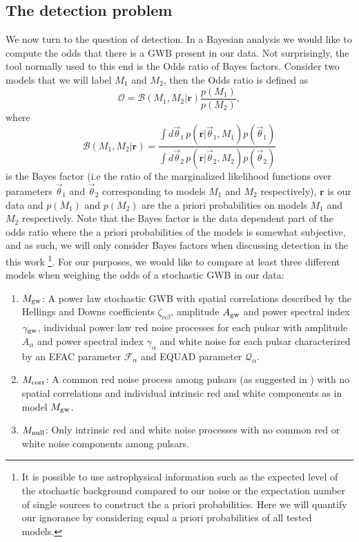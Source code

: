 \documentclass[iop]{emulateapj} \usepackage{apjfonts}
\newcommand{\be}{\begin{equation}} \newcommand{\ee}{\end{equation}}
\begin{document}
 
\subsection{The detection problem} 

We now turn to the question of
detection. In a Bayesian analysis we would like to compute the odds
that there is a GWB present in our data. Not surprisingly, the tool
normally used to this end is the Odds ratio of Bayes factors. Consider
two models that we will label $M_{1}$ and $M_{2}$, then the Odds ratio
is defined as \be
\mathcal{O}=\mathcal{B}(M_{1},M_{2}|\mathbf{r})\frac{p(M_{1})}{p(M_{2})},
\ee
 where
 \be
 \mathcal{B}(M_{1},M_{2}|\mathbf{r})=\frac{\int
d\vec\theta_{1}\,p(\mathbf{r}|\vec\theta_{1},M_{1})p(\vec\theta_{1})}{\int
d\vec\theta_{2}\,p(\mathbf{r}|\vec\theta_{2},M_{2})p(\vec\theta_{2})}
 \ee
 is the Bayes factor (i.e the ratio of the marginalized likelihood
functions over parameters $\vec\theta_{1}$ and $\vec\theta_{2}$
corresponding to models $M_{1}$ and $M_{2}$ respectively),
$\mathbf{r}$ is our data and $p(M_{1})$ and $p(M_{2})$ are the a
priori probabilities on models $M_{1}$ and $M_{2}$ respectively. Note
that the Bayes factor is the data dependent part of the odds ratio
where the a priori probabilities of the models is somewhat subjective,
and as such, we will only consider Bayes factors when discussing
detection in the this work \footnote{It is possible to use
astrophysical information such as the expected level of the stochastic
background compared to our noise or the expectation number of single
sources to construct the a priori probabilities. Here we will quantify
our ignorance by considering equal a priori probabilities of all
tested models.}. For our purposes, we would like to compare at least
three different models when weighing the odds of a stochastic GWB in
our data:
 \begin{enumerate}
 
 \item $M_{\rm gw}$: A power law stochastic GWB with spatial
correlations described by the Hellings and Downs coefficients
$\zeta_{\alpha\beta}$, amplitude $A_{\rm gw}$ and power spectral index
$\gamma_{\rm gw}$, individual power law red noise processes for each
pulsar with amplitude $A_{\alpha}$ and power spectral index
$\gamma_{\alpha}$ and white noise for each pulsar characterized by an
EFAC parameter $\mathcal{F}_{\alpha}$ and EQUAD parameter
$\mathcal{Q}_{\alpha}$.
 
 \item $M_{\rm corr}$: A common red noise process among pulsars (as
suggested in \cite{sc10}) with no spatial correlations and individual
intrinsic red and white components as in model $M_{\rm gw}$.
 
 \item $M_{\rm null}$: Only intrinsic red and white noise processes
with no common red or white noise components among pulsars.
 
 \end{enumerate}
\end{document}
